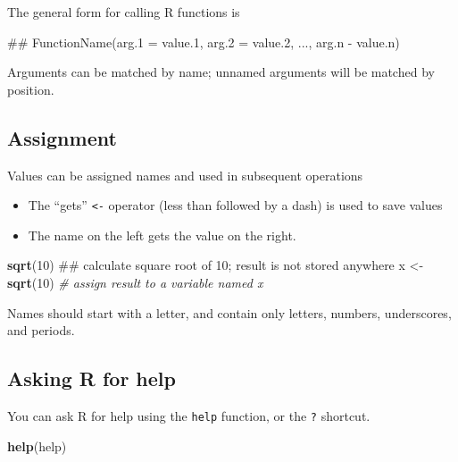 \documentclass[]{book}
\newenvironment{Shaded}{\begin{snugshade}}{\end{snugshade}}
\newcommand{\KeywordTok}[1]{\textcolor[rgb]{0.13,0.29,0.53}{\textbf{#1}}}
\newcommand{\DecValTok}[1]{\textcolor[rgb]{0.00,0.00,0.81}{#1}}
\newcommand{\StringTok}[1]{\textcolor[rgb]{0.31,0.60,0.02}{#1}}
\newcommand{\CommentTok}[1]{\textcolor[rgb]{0.56,0.35,0.01}{\textit{#1}}}
\newcommand{\NormalTok}[1]{#1}
\providecommand{\tightlist}{%
  \setlength{\itemsep}{0pt}\setlength{\parskip}{0pt}}
\begin{document}
The general form for calling R functions is

\begin{Shaded}
\begin{Highlighting}[]
\NormalTok{## FunctionName(arg.1 = value.1, arg.2 = value.2, ..., arg.n - value.n)}
\end{Highlighting}
\end{Shaded}

Arguments can be matched by name; unnamed arguments will be matched by
position.

\subsection{Assignment}\label{assignment}

Values can be assigned names and used in subsequent operations

\begin{itemize}
\tightlist
\item
  The ``gets'' \texttt{\textless{}-} operator (less than followed by a
  dash) is used to save values
\item
  The name on the left gets the value on the right.
\end{itemize}

\begin{Shaded}
\begin{Highlighting}[]
\KeywordTok{sqrt}\NormalTok{(}\DecValTok{10}\NormalTok{) ## calculate square root of 10; result is not stored anywhere}
\NormalTok{x <-}\StringTok{ }\KeywordTok{sqrt}\NormalTok{(}\DecValTok{10}\NormalTok{) }\CommentTok{# assign result to a variable named x}
\end{Highlighting}
\end{Shaded}

Names should start with a letter, and contain only letters, numbers,
underscores, and periods.

\subsection{Asking R for help}\label{asking-r-for-help}

You can ask R for help using the \texttt{help} function, or the
\texttt{?} shortcut.

\begin{Shaded}
\begin{Highlighting}[]
\KeywordTok{help}\NormalTok{(help)}
\end{Highlighting}
\end{Shaded}
\end{document}
